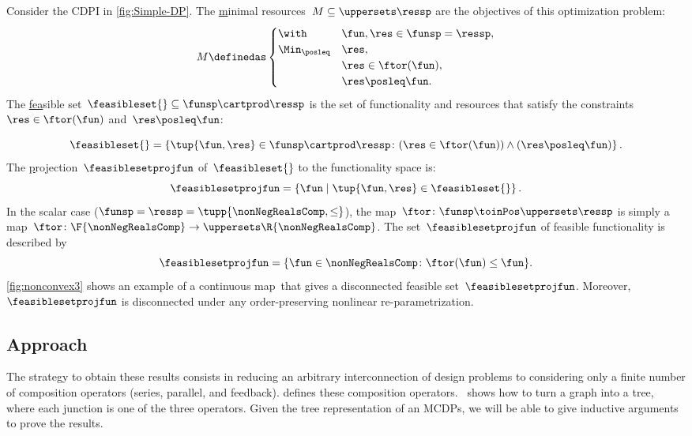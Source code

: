 \begin{example}
	\label{exa:one}
	Consider the CDPI in \cref{fig:Simple-DP}.
	The \uline{m}inimal resources~$M\subseteq\uppersets \ressp$ are the objectives of this optimization problem:
	\begin{equation*}
		M\definedas\begin{cases}
			\with          & \fun,\res\in\funsp=\ressp, \\
			\Min_{\posleq} & \res,                      \\
			               & \res\in\ftor(\fun),        \\
			               & \res\posleq\fun.
		\end{cases}
	\end{equation*}
	The \uline{fea}sible set~$\feasibleset{}\subseteq\funsp\cartprod\ressp$ is the set of functionality and resources that satisfy the constraints~$\res\in\ftor(\fun)$ and~$\res\posleq\fun$:

	\begin{equation}
		\feasibleset{}=\left\{ \tup{\fun,\res}\in\funsp\cartprod\ressp\colon (\res\in\ftor(\fun))\wedge(\res\posleq\fun)\right\} .
		\label{eq:feasible}
	\end{equation}
	The \uline{p}rojection~$\feasiblesetprojfun$ of~$\feasibleset{}$ to the functionality space is:
	\begin{equation*}
		\feasiblesetprojfun=\left\{ \fun\mid\tup{\fun,\res} \in\feasibleset{}\right\}.
	\end{equation*}
	In the scalar case ($\funsp=\ressp=\tupp{\nonNegRealsComp,\leq}$), the map~$\ftor\colon\funsp\toinPos\uppersets \ressp$ is simply a map~$\ftor\colon\F{\nonNegRealsComp}\to \uppersets\R{\nonNegRealsComp}$.
	The set~$\feasiblesetprojfun$ of feasible functionality is described by
	\begin{equation}
		\feasiblesetprojfun=\{\fun\in\nonNegRealsComp\colon \ftor(\fun)\leq\fun\}.
		\label{eq:Pfeasible}
	\end{equation}
	\cref{fig:nonconvex3} shows an example of a continuous map~\ftor that gives a disconnected feasible set~$\feasiblesetprojfun$.
	Moreover,~$\feasiblesetprojfun$ is disconnected under any order-preserving nonlinear re-parametrization.

\end{example}

\subsection{Approach}

The strategy to obtain these results  consists in reducing an arbitrary interconnection of design problems to considering only a finite number of composition operators (series, parallel, and feedback).
 defines these composition operators.
~shows how to turn a graph into a tree, where each junction is one of the three operators.
Given the tree representation of an MCDPs, we will be able to give inductive arguments to prove the results.

